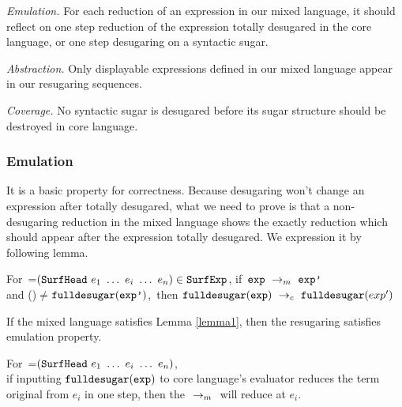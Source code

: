 \emph{Emulation.} For each reduction of an expression in our mixed language, it should reflect on one step reduction of the expression totally desugared in the core language, or one step desugaring on a syntactic sugar.

\emph{Abstraction.} Only displayable expressions defined in our mixed language appear in our resugaring sequences.

\emph{Coverage.} No syntactic sugar is desugared before its sugar structure should be destroyed in core language.

\subsubsection{Emulation} It is a basic property for correctness. Because desugaring won't change an expression after totally desugared, what we need to prove is that a non-desugaring reduction in the mixed language shows the exactly reduction which should appear after the expression totally desugared. We expression it by following lemma.

\begin{lemma}
\label{lemma1}

For~=$(\mbox{\tt SurfHead}~e_1~\ldots~e_i~\ldots~e_n)\in\mbox{\tt SurfExp}$, if~$\mbox{\tt exp} ~\rightarrow_m~\mbox{\tt exp'}$\\ and ()$\not=$$\mbox{\tt fulldesugar}(\mbox{\tt exp'})$,~then $\mbox{\tt fulldesugar}(\mbox{\tt exp}) ~\rightarrow_c~\mbox{\tt fulldesugar}(exp')$

\end{lemma}

\begin{Def}[Emulation]
If the mixed language satisfies Lemma \ref{lemma1}, then the resugaring satisfies emulation property.
\end{Def}

\begin{lemma}
\label{lemma2}

For~=$(\mbox{\tt SurfHead}~e_1~\ldots~e_i~\ldots~e_n)$,\\ if inputting $\mbox{\tt fulldesugar}(\mbox{\tt exp})$ to core language's evaluator reduces the term original from $e_i$ in one step, then the $~\rightarrow_m~$ will reduce  at $e_i$.

\end{lemma}

